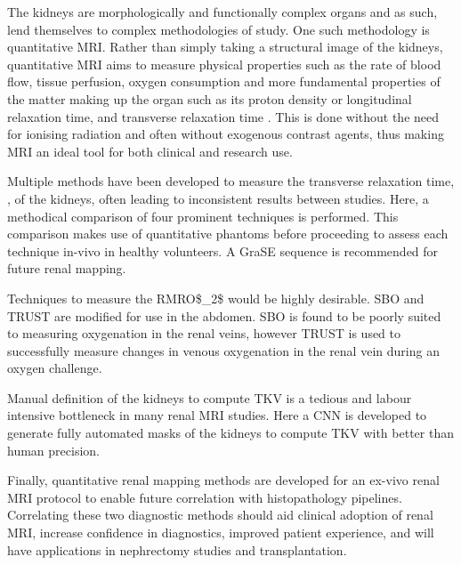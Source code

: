 The kidneys are morphologically and functionally complex organs and as such, lend themselves to complex methodologies of study. One such methodology is quantitative \ac{MRI}. Rather than simply taking a structural image of the kidneys, quantitative \ac{MRI} aims to measure physical properties such as the rate of blood flow, tissue perfusion, oxygen consumption and more fundamental properties of the matter making up the organ such as its proton density or longitudinal relaxation time, \tone and transverse relaxation time \ttwo. This is done without the need for ionising radiation and often without exogenous contrast agents, thus making \ac{MRI} an ideal tool for both clinical and research use.

Multiple methods have been developed to measure the transverse relaxation time, \ttwo, of the kidneys, often leading to inconsistent results between studies. Here, a methodical comparison of four prominent techniques is performed. This comparison makes use of quantitative phantoms before proceeding to assess each technique in-vivo in healthy volunteers. A \ac{GraSE} sequence is recommended for future renal \ttwo mapping.

Techniques to measure the \ac{RMRO$_2$} would be highly desirable. \ac{SBO} and \ac{TRUST} are modified for use in the abdomen. \ac{SBO} is found to be poorly suited to measuring oxygenation in the renal veins, however \ac{TRUST} is used to successfully measure changes in venous oxygenation  in the renal vein during an oxygen challenge.

Manual definition of the kidneys to compute \ac{TKV} is a tedious and labour intensive bottleneck in many renal \ac{MRI} studies. Here a \ac{CNN} is developed to generate fully automated masks of the kidneys to compute \ac{TKV} with better than human precision.

Finally, quantitative renal mapping methods are developed for an ex-vivo renal \ac{MRI} protocol to enable future correlation with histopathology pipelines. Correlating these two diagnostic methods should aid clinical adoption of renal \ac{MRI}, increase confidence in diagnostics, improved patient experience, and will have applications in nephrectomy studies and transplantation.
